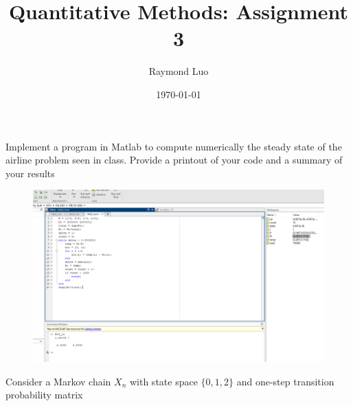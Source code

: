 \documentclass[12pt,twoside, letter]{exam}
\theoremstyle{definition}
\begin{document}
\abovedisplayskip=12pt
\belowdisplayskip=12pt
\abovedisplayshortskip=7pt
\belowdisplayshortskip=10pt
\allowdisplaybreaks

\setlength{\parindent}{18pt}

\title{Quantitative Methods: Assignment 3}
\author{Raymond Luo}
\date{\today}
\maketitle

\par{Implement a program in Matlab to compute numerically the steady state of the airline problem seen in class. Provide a printout of your code and
a summary of your results}
\begin{solution}
  \begin{figure}[H]
    \centering
      \includegraphics[width=5in]{Hw3_1a}
  \end{figure}
\end{solution}


\par{Consider a Markov chain $X_{n}$ with state space $\{0,1,2 \}$ and one-step transition probability matrix }
\end{document}
